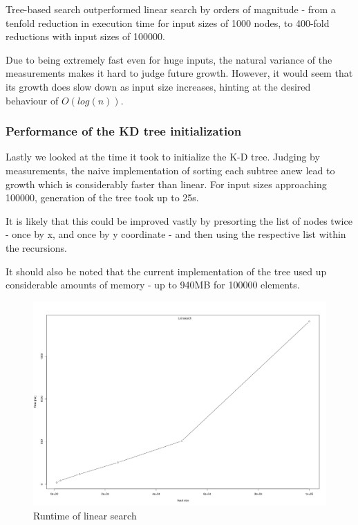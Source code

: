 \documentclass[a4paper]{scrartcl}
\begin{document}
Tree-based search outperformed linear search by orders of magnitude - from a
tenfold reduction in execution time for input sizes of 1000 nodes, to 400-fold
reductions with input sizes of 100000.

Due to being extremely fast even for huge inputs, the natural variance of the
measurements makes it hard to judge future growth. However, it would seem that
its growth does slow down as input size increases, hinting at the desired
behaviour of $O(log(n))$.

\subsubsection{Performance of the KD tree initialization}

Lastly we looked at the time it took to initialize the K-D tree. Judging by
measurements, the naive implementation of sorting each subtree anew lead to
growth which is considerably faster than linear. For input sizes approaching
100000, generation of the tree took up to 25s.

It is likely that this could be improved vastly by presorting the list of nodes
twice - once by x, and once by y coordinate - and then using the respective list
within the recursions. 

It should also be noted that the current implementation of the tree used up
considerable amounts of memory - up to 940MB for 100000 elements.

\begin{figure}
	\centering
	\caption{Runtime of linear search}
	\includegraphics[width=\linewidth]{resources/search_time_list.png}
\end{figure}
\end{document}
